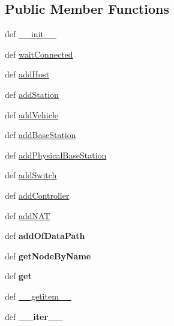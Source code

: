 \subsection*{Public Member Functions}
\begin{DoxyCompactItemize}
\item 
def \hyperlink{classmininet_1_1net_1_1Mininet_a1ed0f0c8ba06a398e02f3952cc4c8393}{\-\_\-\-\_\-init\-\_\-\-\_\-}
\item 
def \hyperlink{classmininet_1_1net_1_1Mininet_ac96ae3d7c168df6c32cbd8a2a1a5a6fe}{wait\-Connected}
\item 
def \hyperlink{classmininet_1_1net_1_1Mininet_aaf25d268b50efdfc7e6c2f4e5e940168}{add\-Host}
\item 
def \hyperlink{classmininet_1_1net_1_1Mininet_aef34acef029345ac8c6fb5860719b103}{add\-Station}
\item 
def \hyperlink{classmininet_1_1net_1_1Mininet_a879cfb9e1c99187836cbfc3fd034645f}{add\-Vehicle}
\item 
def \hyperlink{classmininet_1_1net_1_1Mininet_a271d2c78fc3b8d6e54220ca1f2fd57c4}{add\-Base\-Station}
\item 
def \hyperlink{classmininet_1_1net_1_1Mininet_a7b3e0a0b6a02333067e9d6de5fb0c36a}{add\-Physical\-Base\-Station}
\item 
def \hyperlink{classmininet_1_1net_1_1Mininet_ae4dee4ab63ee9d46bbf3d069dbe9ebbb}{add\-Switch}
\item 
def \hyperlink{classmininet_1_1net_1_1Mininet_aecca42852bcd3f0ef885fa53c07dd2a1}{add\-Controller}
\item 
def \hyperlink{classmininet_1_1net_1_1Mininet_aec5d9c44503b066bf50da7235f622540}{add\-N\-A\-T}
\item 
\hypertarget{classmininet_1_1net_1_1Mininet_a9b0b08399c44a8749c22b6a7e65711a2}{def {\bfseries add\-Of\-Data\-Path}}\label{classmininet_1_1net_1_1Mininet_a9b0b08399c44a8749c22b6a7e65711a2}

\item 
\hypertarget{classmininet_1_1net_1_1Mininet_ab92c0b5ef6f8ee38395753bdceb5fbb2}{def {\bfseries get\-Node\-By\-Name}}\label{classmininet_1_1net_1_1Mininet_ab92c0b5ef6f8ee38395753bdceb5fbb2}

\item 
\hypertarget{classmininet_1_1net_1_1Mininet_aab68ae4924798f60d1b87cc63e6b63ff}{def {\bfseries get}}\label{classmininet_1_1net_1_1Mininet_aab68ae4924798f60d1b87cc63e6b63ff}

\item 
def \hyperlink{classmininet_1_1net_1_1Mininet_a2fe3040d8714f0357b9658820770ee62}{\-\_\-\-\_\-getitem\-\_\-\-\_\-}
\item 
\hypertarget{classmininet_1_1net_1_1Mininet_a3cf367cc6e182457b5bc1db610dbfb3b}{def {\bfseries \-\_\-\-\_\-iter\-\_\-\-\_\-}}\label{classmininet_1_1net_1_1Mininet_a3cf367cc6e182457b5bc1db610dbfb3b}


\end{DoxyCompactItemize}
